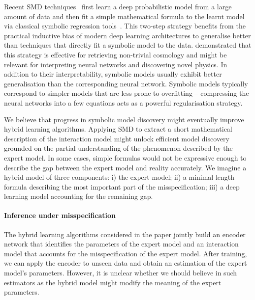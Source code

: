 Recent SMD techniques~\citep{cranmer2020discovering} first learn a deep probabilistic model from a large amount of data and then fit a simple mathematical formula to the learnt model via classical symbolic regression tools~\citep{schmidt2009distilling}. This two-step strategy benefits from the practical inductive bias of modern deep learning architectures to generalise better than techniques that directly fit a symbolic model to the data. \citet{cranmer2020discovering} demonstrated that this strategy is effective for retrieving non-trivial cosmology and might be relevant for interpreting neural networks and discovering novel physics. In addition to their interpretability, symbolic models usually exhibit better generalisation than the corresponding neural network. Symbolic models typically correspond to simpler models that are less prone to overfitting -- compressing the neural networks into a few equations acts as a powerful regularisation strategy.

We believe that progress in symbolic model discovery might eventually improve hybrid learning algorithms. Applying SMD to extract a short mathematical description of the interaction model might unlock efficient model discovery grounded on the partial understanding of the phenomenon described by the expert model. In some cases, simple formulas would not be expressive enough to describe the gap between the expert model and reality accurately. We imagine a hybrid model of three components:
i) the expert model;
ii) a minimal length formula describing the most important part of the misspecification;
iii) a deep learning model accounting for the remaining gap.

\paragraph{Inference under misspecification}
The hybrid learning algorithms considered in the paper jointly build an encoder network that identifies the parameters of the expert model and an interaction model that accounts for the misspecification of the expert model. After training, we can apply the encoder to unseen data and obtain an estimation of the expert model's parameters. However, it is unclear whether we should believe in such estimators as the hybrid model might modify the meaning of the expert parameters.

